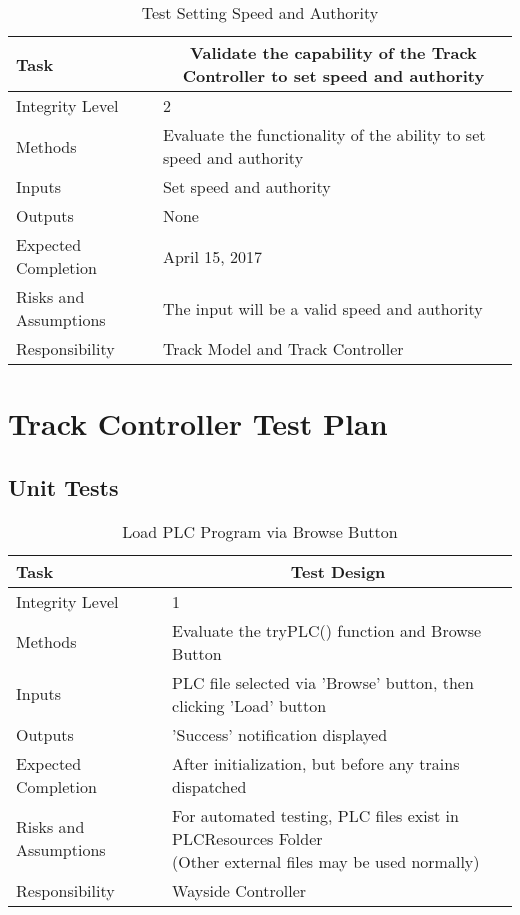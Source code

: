 \documentclass[]{article}
\begin{document}
\begin{table}[H]
	\centering
	\caption{Test Setting Speed and Authority}
	\begin{tabular}{|l|l|}
		\hline
		Task & \multicolumn{1}{c|}{Validate the capability of the Track Controller to set speed and authority} \\ \hline
		Integrity Level & 2\\ \hline
		Methods & Evaluate the functionality of the ability to set speed and authority \\ \hline
		Inputs &  Set speed and authority\\ \hline
		Outputs &  \parbox[t]{10cm}{None}\\ \hline
		Expected Completion & April 15, 2017\\ \hline
		Risks and Assumptions & The input will be a valid speed and authority \\ \hline
		Responsibility & Track Model and Track Controller\\ \hline
	\end{tabular}
\end{table}

\section{Track Controller Test Plan}
\subsection{Unit Tests}
\begin{table}[H]
	\centering
	\caption{Load PLC Program via Browse Button}
	\begin{tabular}{|l|l|}
		\hline
		Task & \multicolumn{1}{c|}{Test Design} \\ \hline
		Integrity Level & 1 \\ \hline
		Methods & Evaluate the tryPLC() function and Browse Button\\ \hline
		Inputs &  PLC file selected via 'Browse' button, then clicking 'Load' button \\ \hline
		Outputs &  'Success' notification displayed \\ \hline
		Expected Completion & After initialization, but before any trains dispatched\\ \hline
		Risks and Assumptions & \parbox[t]{10cm}{For automated testing, PLC files exist in PLCResources Folder \\(Other external files may be used normally)}  \\ \hline
		Responsibility & Wayside Controller\\ \hline
	\end{tabular}
\end{table}
\end{document}
